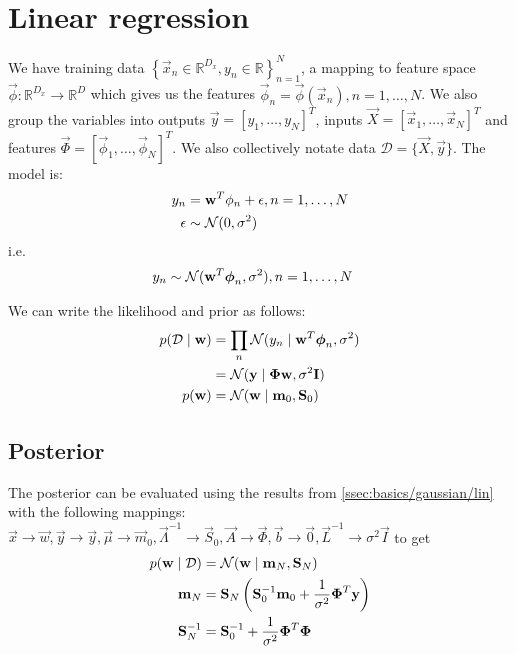 \section{Linear regression}
\label{sec:models/linr}
We have training data $\left\{\vec x_n \in \mathbb R^{D_x}, y_n \in \mathbb R\right\}_{n = 1}^N$, a mapping to feature space $\vec\phi: \mathbb R^{D_x} \to \mathbb R^D$ which gives us the features $\vec \phi_n = \vec\phi(\vec x_n), n = 1, \dotsc, N$. We also group the variables into outputs $\vec y = [y_1, \dotsc, y_N]^T$, inputs $\vec X = [\vec x_1, \dotsc, \vec x_N]^T$ and features $\vec \Phi = [\vec \phi_1, \dotsc, \vec \phi_N]^T$. We also collectively notate data $\mathcal D = \{\vec X, \vec y\}$. The model is:
\begin{align}
	y_n 		&= \boldsymbol{\mathbf{w}}^T \phi_n + \epsilon, n = 1, \dotsc, N\\
	\epsilon 	&\sim \operatorname{\mathcal N}(0, \sigma^2)
\end{align}
i.e.
\begin{align}
	y_n 		&\sim \operatorname{\mathcal N}(\boldsymbol{\mathbf{w}}^T \boldsymbol{\mathbf{\phi}}_n, \sigma^2), n = 1, \dotsc, N
\end{align}

We can write the likelihood and prior as follows:
\begin{align}
	p(\mathcal D \mid \boldsymbol{\mathbf{w}})	&= \prod_n \operatorname{\mathcal N}(y_n \mid \boldsymbol{\mathbf{w}}^T \boldsymbol{\mathbf{\phi}}_n, \sigma^2) \nonumber\\
								&= \operatorname{\mathcal N}(\boldsymbol{\mathbf{y}} \mid \boldsymbol{\mathbf{\Phi}} \boldsymbol{\mathbf{w}}, \sigma^2 \boldsymbol{\mathbf{I}}) \\
	p(\boldsymbol{\mathbf{w}})					&= \operatorname{\mathcal N}(\boldsymbol{\mathbf{w}} \mid \boldsymbol{\mathbf{m}}_0, \boldsymbol{\mathbf{S}}_0)
\end{align}

\subsection{Posterior}
The posterior can be evaluated using the results from \ref{ssec:basics/gaussian/lin} with the following mappings: $\vec x \to \vec w, \vec y \to \vec y, \vec \mu \to \vec m_0, \vec \Lambda^{-1} \to \vec S_0, \vec A \to \vec \Phi, \vec b \to \vec 0, \vec L^{-1} \to \sigma^2 \vec I$ to get
\begin{align}
	p(\boldsymbol{\mathbf{w}} \mid \mathcal D)	&= \operatorname{\mathcal N}(\boldsymbol{\mathbf{w}} \mid \boldsymbol{\mathbf{m}}_N, \boldsymbol{\mathbf{S}}_N) \\
	\boldsymbol{\mathbf{m}}_N					&= \boldsymbol{\mathbf{S}}_N \left(\boldsymbol{\mathbf{S}}_0^{-1} \boldsymbol{\mathbf{m}}_0 + \frac{1}{\sigma^2} \boldsymbol{\mathbf{\Phi}}^T \boldsymbol{\mathbf{y}}\right) \\
	\boldsymbol{\mathbf{S}}_N^{-1}				&= \boldsymbol{\mathbf{S}}_0^{-1} + \frac{1}{\sigma^2} \boldsymbol{\mathbf{\Phi}}^T \boldsymbol{\mathbf{\Phi}}
\end{align}

